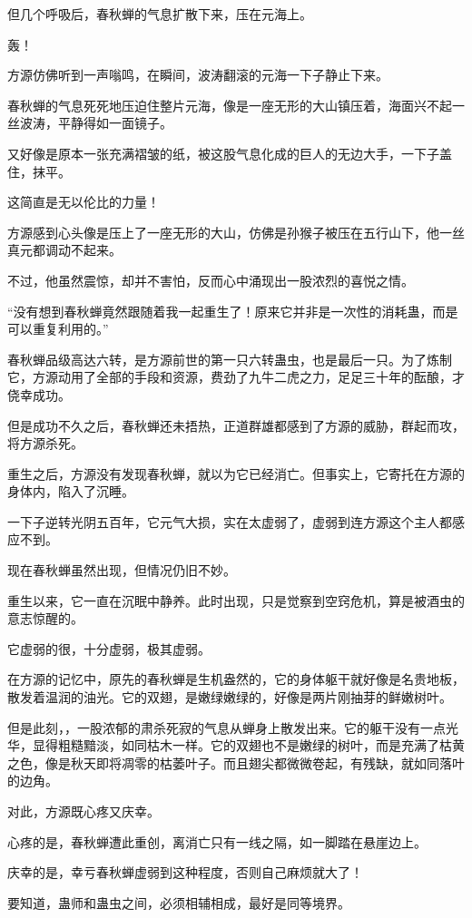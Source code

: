 \begin{this_body}
但几个呼吸后，春秋蝉的气息扩散下来，压在元海上。

轰！

方源仿佛听到一声嗡鸣，在瞬间，波涛翻滚的元海一下子静止下来。

春秋蝉的气息死死地压迫住整片元海，像是一座无形的大山镇压着，海面兴不起一丝波涛，平静得如一面镜子。

又好像是原本一张充满褶皱的纸，被这股气息化成的巨人的无边大手，一下子盖住，抹平。

这简直是无以伦比的力量！

方源感到心头像是压上了一座无形的大山，仿佛是孙猴子被压在五行山下，他一丝真元都调动不起来。

不过，他虽然震惊，却并不害怕，反而心中涌现出一股浓烈的喜悦之情。

“没有想到春秋蝉竟然跟随着我一起重生了！原来它并非是一次性的消耗蛊，而是可以重复利用的。”

春秋蝉品级高达六转，是方源前世的第一只六转蛊虫，也是最后一只。为了炼制它，方源动用了全部的手段和资源，费劲了九牛二虎之力，足足三十年的酝酿，才侥幸成功。

但是成功不久之后，春秋蝉还未捂热，正道群雄都感到了方源的威胁，群起而攻，将方源杀死。

重生之后，方源没有发现春秋蝉，就以为它已经消亡。但事实上，它寄托在方源的身体内，陷入了沉睡。

一下子逆转光阴五百年，它元气大损，实在太虚弱了，虚弱到连方源这个主人都感应不到。

现在春秋蝉虽然出现，但情况仍旧不妙。

重生以来，它一直在沉眠中静养。此时出现，只是觉察到空窍危机，算是被酒虫的意志惊醒的。

它虚弱的很，十分虚弱，极其虚弱。

在方源的记忆中，原先的春秋蝉是生机盎然的，它的身体躯干就好像是名贵地板，散发着温润的油光。它的双翅，是嫩绿嫩绿的，好像是两片刚抽芽的鲜嫩树叶。

但是此刻，，一股浓郁的肃杀死寂的气息从蝉身上散发出来。它的躯干没有一点光华，显得粗糙黯淡，如同枯木一样。它的双翅也不是嫩绿的树叶，而是充满了枯黄之色，像是秋天即将凋零的枯萎叶子。而且翅尖都微微卷起，有残缺，就如同落叶的边角。

对此，方源既心疼又庆幸。

心疼的是，春秋蝉遭此重创，离消亡只有一线之隔，如一脚踏在悬崖边上。

庆幸的是，幸亏春秋蝉虚弱到这种程度，否则自己麻烦就大了！

要知道，蛊师和蛊虫之间，必须相辅相成，最好是同等境界。


\end{this_body}
